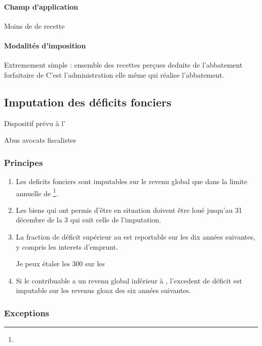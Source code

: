 				\paragraph{Champ d'application}

				Moins de  de recette


				\paragraph{Modalités d'imposition}

				Extremement simple : ensemble des recettes perçues deduite de l'abbatement forfaitaire de 
				C'est l'administration elle même qui réalise l'abbatement.


	\subsection{Imputation des déficits fonciers}

		Dispositif prévu à l'

		Abus avocats fiscalistes


		\subsubsection{Principes}

			\begin{enumerate}
				\item Les deficits fonciers sont imputables sur le revenu global que dans la limite annuelle de \footnote{}.
				\item Les biens qui ont permis d'être en situation doivent être loué jusqu'au 31 décembre de la 3\ieme{} qui suit celle de l'imputation.
				\item La fraction de déficit supérieur au  est reportable sur les dix années suivantes, y compris les interets d'emprunt.
					\begin{exemple}
						Je peux étaler les 300 sur les
					\end{exemple}
				\item Si le contribuable a un revenu global inférieur à , l'excedent de déficit est imputable sur les revenus gloax des six années suivantes.
			\end{enumerate}

		\subsubsection{Exceptions}

